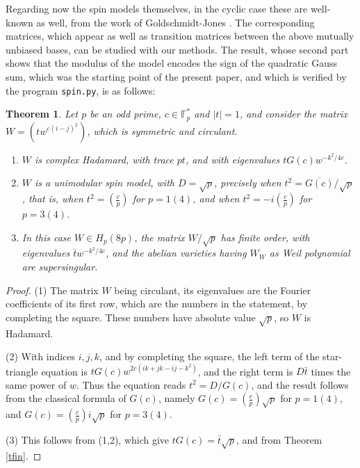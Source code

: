 \documentclass[11pt]{amsart}
\newtheorem{theorem}{Theorem}[section]
\theoremstyle{definition}
\begin{document}
\medskip

Regarding now the spin models themselves, in the cyclic case these are well-known as well, from the work of Goldschmidt-Jones \cite{gjo}. The corresponding matrices, which appear as well as transition matrices between the above mutually unbiased bases, can be studied with our methods. The result, whose second part shows that the modulus of the model encodes the sign of the quadratic Gauss sum, which was the starting point of the present paper, and which is verified by the program \texttt{spin.py}, is as follows:

\begin{theorem}
Let $p$ be an odd prime, $c\in\mathbb F_p^*$ and $|t|=1$, and consider the matrix $W=(tw^{c(i-j)^2})$, which is symmetric and circulant.
\begin{enumerate}
\item $W$ is complex Hadamard, with trace $pt$, and with eigenvalues $tG(c)w^{-k^2/4c}$.

\item $W$ is a unimodular spin model, with $D=\sqrt{p}$, precisely when $t^2=\overline{G(c)}/\sqrt{p}$, that is, when $t^2=\left(\frac{c}{p}\right)$ for $p=1(4)$, and when $t^2=-i\left(\frac{c}{p}\right)$ for $p=3(4)$.

\item In this case $W\in H_p(8p)$, the matrix $W/\sqrt{p}$ has finite order, with eigenvalues $\bar{t}w^{-k^2/4c}$, and the abelian varieties having $W_W$ as Weil polynomial are supersingular.
\end{enumerate}
\end{theorem}

\begin{proof}
(1) The matrix $W$ being circulant, its eigenvalues are the Fourier coefficients of its first row, which are the numbers in the statement, by completing the square. These numbers have absolute value $\sqrt{p}$, so $W$ is Hadamard.

\medskip

(2) With indices $i,j,k$, and by completing the square, the left term of the star-triangle equation is $tG(c)w^{2c(ik+jk-ij-k^2)}$, and the right term is $D\bar{t}$ times the same power of $w$. Thus the equation reads $t^2=D/G(c)$, and the result follows from the classical formula of $G(c)$, namely $G(c)=\left(\frac{c}{p}\right)\sqrt{p}$ for $p=1(4)$, and $G(c)=\left(\frac{c}{p}\right)i\sqrt{p}$ for $p=3(4)$.

\medskip

(3) This follows from (1,2), which give $tG(c)=\bar{t}\sqrt{p}$, and from Theorem \ref{tfin}.
\end{proof}
\end{document}
